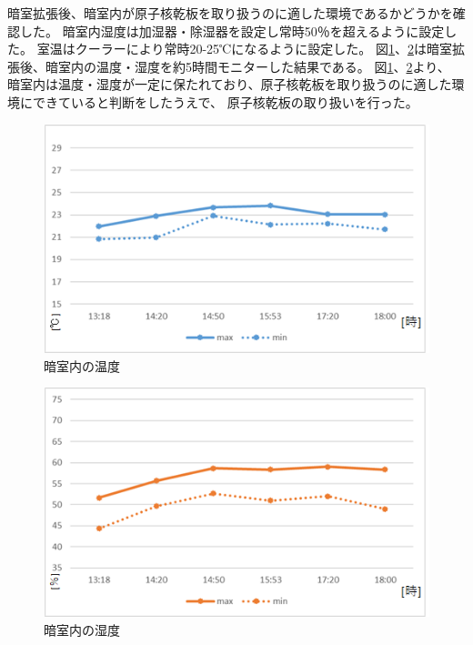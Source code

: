 \documentclass[12pt,a4paper]{jarticle}
\begin{document}
\newpage
\par
暗室拡張後、暗室内が原子核乾板を取り扱うのに適した環境であるかどうかを確認した。
暗室内湿度は加湿器・除湿器を設定し常時50％を超えるように設定した。
室温はクーラーにより常時20-25℃になるように設定した。
図\ref{fig:darkroom_onndo}、\ref{fig:darkroom_situdo}は暗室拡張後、暗室内の温度・湿度を約5時間モニターした結果である。
図\ref{fig:darkroom_onndo}、\ref{fig:darkroom_situdo}より、
暗室内は温度・湿度が一定に保たれており、原子核乾板を取り扱うのに適した環境にできていると判断をしたうえで、
原子核乾板の取り扱いを行った。
\begin{figure}[htbp]
  \centering
    \includegraphics[width=120mm]{darkroom_temp.png}
  \caption{暗室内の温度\label{fig:darkroom_onndo}}
\end{figure}
\begin{figure}[htbp]
  \centering
    \includegraphics[width=120mm]{darkroom_mist.png}
  \caption{暗室内の湿度\label{fig:darkroom_situdo}}
\end{figure}
\end{document}
